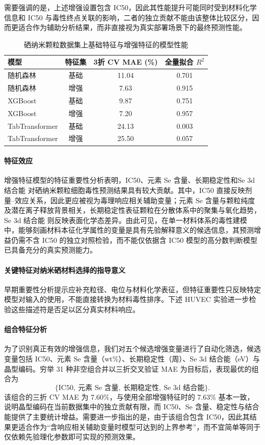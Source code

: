 需要强调的是，上述增强设置包含 IC50，因此其性能提升可能同时受到材料化学信息和 IC50 与毒性终点关联的影响，二者的独立贡献不能由该整体比较区分，因而更适合作为辅助分析结果，而非直接视为真实部署场景下的最终预测性能。

\begin{table}[htbp]
  \centering
  \caption{硒纳米颗粒数据集上基础特征与增强特征的模型性能}
  \label{tab:senp_legacy_results}
  \begin{tabular}{lccc}
    \hline
    模型 & 特征集 & 3折 CV MAE (\%) & 全量拟合 $R^2$ \\
    \hline
    随机森林 & 基础 & 11.04 & 0.701 \\
    随机森林 & 增强 & 7.63 & 0.915 \\
    XGBoost & 基础 & 9.87 & 0.751 \\
    XGBoost & 增强 & 7.20 & 0.957 \\
    TabTransformer & 基础 & 24.13 & 0.003 \\
    TabTransformer & 增强 & 25.50 & 0.057 \\
    \hline
  \end{tabular}
\end{table}

\paragraph{特征效应}
增强特征模型的特征重要性分析表明，IC50、元素 Se 含量、长期稳定性和Se 3d 结合能 对硒纳米颗粒细胞毒性预测结果具有较大贡献。其中，IC50 直接反映剂量--效应关系，因此更应被视为毒理响应相关辅助变量；元素 Se 含量与颗粒纯度及潜在离子释放背景相关，长期稳定性表征颗粒在分散体系中的聚集与氧化趋势，Se 3d 结合能 则反映表面化学态差异。由此可见，在单一材料体系的毒性建模中，能够刻画材料本征化学属性的变量是具有先验解释意义的候选信息，其预测增益仍需不含 IC50 的独立对照检验，而不能仅依据含 IC50 模型的高分数判断模型已具备充分的真实预测能力。

\paragraph{关键特征对纳米硒材料选择的指导意义}
早期重要性分析提示应补充粒径、电位与材料化学表征，但特征重要性只反映特定模型对输入的使用，不能直接转换为材料毒性排序。下述 HUVEC 实验进一步检验这些描述符是否足以区分真实材料响应。

\paragraph{组合特征分析}
为了识别真正有效的增强信息，我们对五个候选增强变量进行了自动化筛选，候选变量包括 IC50、元素 Se 含量（wt\%）、长期稳定性（周）、Se 3d 结合能（eV）与晶型编码。穷举 31 种非空组合并以三折交叉验证 MAE 为目标后，表现最优的组合为
\[
\{\text{IC50},\ \text{元素 Se 含量},\ \text{长期稳定性},\ \text{Se 3d 结合能}\}.
\]
该组合的三折 CV MAE 为 7.60\%，与使用全部增强特征时的 7.63\% 基本一致，说明晶型编码在当前数据集中的独立贡献有限，而 IC50、Se 含量、稳定性与结合能提供了主要统计增益。需要进一步指出的是，由于该组合包含 IC50，因此其结果更适合作为“含响应相关辅助变量时模型可达到的上界参考”，而不宜简单等同于仅依赖先验理化参数即可实现的预测效果。

